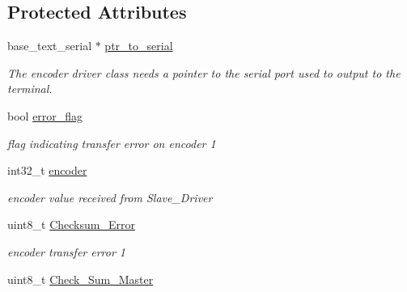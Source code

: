 \subsection*{Protected Attributes}
\begin{DoxyCompactItemize}
\item 
\hypertarget{class_master_a826ae7a92e5910b4bf275a128a5aafc0}{base\-\_\-text\-\_\-serial $\ast$ \hyperlink{class_master_a826ae7a92e5910b4bf275a128a5aafc0}{ptr\-\_\-to\-\_\-serial}}\label{class_master_a826ae7a92e5910b4bf275a128a5aafc0}

\begin{DoxyCompactList}\small\item\em The encoder driver class needs a pointer to the serial port used to output to the terminal. \end{DoxyCompactList}\item 
\hypertarget{class_master_a4c51d672c465103b0e3a85ff5ae68d79}{bool \hyperlink{class_master_a4c51d672c465103b0e3a85ff5ae68d79}{error\-\_\-flag}}\label{class_master_a4c51d672c465103b0e3a85ff5ae68d79}

\begin{DoxyCompactList}\small\item\em flag indicating transfer error on encoder 1 \end{DoxyCompactList}\item 
\hypertarget{class_master_a3183754384c4bfd6a920c82e5e3b1618}{int32\-\_\-t \hyperlink{class_master_a3183754384c4bfd6a920c82e5e3b1618}{encoder}}\label{class_master_a3183754384c4bfd6a920c82e5e3b1618}

\begin{DoxyCompactList}\small\item\em encoder value received from Slave\-\_\-\-Driver \end{DoxyCompactList}\item 
\hypertarget{class_master_a65e5841164cc7b6e5c5501c12e5a797a}{uint8\-\_\-t \hyperlink{class_master_a65e5841164cc7b6e5c5501c12e5a797a}{Checksum\-\_\-\-Error}}\label{class_master_a65e5841164cc7b6e5c5501c12e5a797a}

\begin{DoxyCompactList}\small\item\em encoder transfer error 1 \end{DoxyCompactList}\item 
\hypertarget{class_master_a1d30123857f1025903e8b6d8a30cff95}{uint8\-\_\-t \hyperlink{class_master_a1d30123857f1025903e8b6d8a30cff95}{Check\-\_\-\-Sum\-\_\-\-Master}}\label{class_master_a1d30123857f1025903e8b6d8a30cff95}


\end{DoxyCompactItemize}
